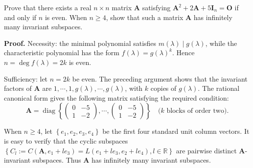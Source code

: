 \documentclass[12pt, a4paper, oneside]{book}
\begin{document}
\begin{question}
    Prove that there exists a real $n \times n$ matrix $\mathbf{A}$ satisfying $\mathbf{A}^2+2 \mathbf{A}+5 \mathbf{I}_n=\mathbf{O}$ if and only if $n$ is even. When $n \geq 4$, show that such a matrix $\mathbf{A}$ has infinitely many invariant subspaces.

    \textbf{Proof.} Necessity: the minimal polynomial satisfies $m(\lambda) \mid g(\lambda)$, while the characteristic polynomial has the form $f(\lambda)=g(\lambda)^k$. Hence $n=\operatorname{deg} f(\lambda)=2 k$ is even.

    Sufficiency: let $n=2 k$ be even. The preceding argument shows that the invariant factors of $\mathbf{A}$ are $1, \cdots, 1, g(\lambda), \cdots, g(\lambda)$, with $k$ copies of $g(\lambda)$. The rational canonical form gives the following matrix satisfying the required condition:
    \[
        \mathbf{A}=\operatorname{diag}\left\{\left(\begin{array}{ll}
                0 & -5 \\
                1 & -2
            \end{array}\right), \cdots,\left(\begin{array}{ll}
                0 & -5 \\
                1 & -2
            \end{array}\right)\right\}\quad\text{($k$ blocks of order two)} .
    \]

    When $n \geq 4$, let $\left\{{e}_1, {e}_2, {e}_3, {e}_4\right\}$ be the first four standard unit column vectors. It is easy to verify that the cyclic subspaces $\left\{C_l:=C\left(\mathbf{A}, e_1+l e_3\right)=L\left(e_1+l e_3, e_2+l e_4\right), l \in \mathbb{R}\right\}$ are pairwise distinct $\mathbf{A}$-invariant subspaces. Thus $\mathbf{A}$ has infinitely many invariant subspaces.
\end{question}
\end{document}
